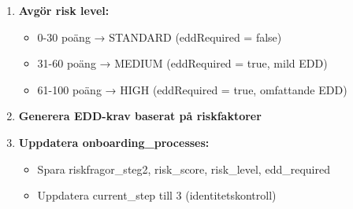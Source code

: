 \documentclass[12pt,a4paper]{article}
\begin{document}
\begin{enumerate}[noitemsep]
\begin{itemize}[noitemsep]
\begin{itemize}[noitemsep]
        \end{itemize}
      \item \textbf{Kontanthantering:}
        \begin{itemize}[noitemsep]
          \item Sällan + <10,000 SEK + goda rutiner → 5-10 poäng (LOW)
          \item Ibland + 10,000-50,000 SEK + acceptabla rutiner → 15-25 poäng (MEDIUM)
          \item Ofta + >50,000 SEK + bristfälliga rutiner → 30-50 poäng (HIGH)
        \end{itemize}
      \item \textbf{Verksamhetsändring:}
        \begin{itemize}[noitemsep]
          \item Naturlig expansion + logisk förklaring → 5-10 poäng (LOW)
          \item Stor förändring + vag förklaring → 15-25 poäng (MEDIUM)
          \item Komplett pivoting + ingen förklaring → 30-40 poäng (HIGH)
        \end{itemize}
      \item \textbf{PEP-status:}
        \begin{itemize}[noitemsep]
          \item Före detta (>2 år sedan) + lokal nivå → 30-40 poäng (HIGH)
          \item Nuvarande + lokal nivå → 50-60 poäng (HIGH)
          \item Nuvarande + nationell/internationell nivå → 70-90 poäng (CRITICAL)
          \item Familj till PEP → +20 poäng extra
        \end{itemize}
    \end{itemize}
  \item \textbf{Avgör risk level:}
    \begin{itemize}[noitemsep]
      \item 0-30 poäng → STANDARD (eddRequired = false)
      \item 31-60 poäng → MEDIUM (eddRequired = true, mild EDD)
      \item 61-100 poäng → HIGH (eddRequired = true, omfattande EDD)
    \end{itemize}
  \item \textbf{Generera EDD-krav baserat på riskfaktorer}
  \item \textbf{Uppdatera onboarding\_processes:}
    \begin{itemize}[noitemsep]
      \item Spara riskfragor\_steg2, risk\_score, risk\_level, edd\_required
      \item Uppdatera current\_step till 3 (identitetskontroll)
    \end{itemize}
\end{enumerate}
\end{document}
